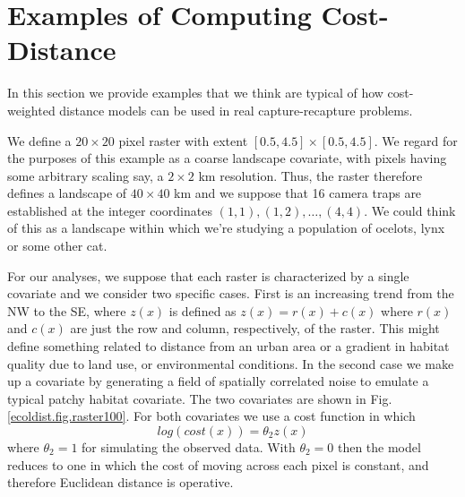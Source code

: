 \documentclass[12pt]{article}
\begin{document}
\section{Examples of Computing Cost-Distance}

In this section we provide examples that we think are typical of
how cost-weighted distance models can be used in real
capture-recapture problems.

We define a $20 \times 20$ pixel raster with
extent $[0.5, 4.5] \times [0.5, 4.5]$.
We regard for the purposes of this example as a coarse landscape
covariate, with pixels having some arbitrary scaling say, a $2 \times 2$ km resolution. Thus, the raster
therefore
defines a landscape of $40 \times 40$ km and we suppose that 16 camera
traps are established at the integer coordinates $(1,1), (1,2), \ldots,
(4,4)$. We could think of this as a landscape within which we're
studying a population of ocelots, lynx or some other cat.

For our analyses, we suppose
that each raster is characterized by a single covariate and we consider two specific
cases. First is an increasing trend from
the NW to the SE, where $z(x)$ is defined as $z(x) = r(x) + c(x)$ where $r(x)$ and $c(x)$ are
just the row and column, respectively, of the raster.
This might define something related to distance
from an urban area or a gradient in habitat quality due to land use,
or environmental conditions.
In the second case we make up a covariate by generating a field of spatially correlated
noise to emulate a typical patchy habitat covariate. The two covariates are shown in
Fig. \ref{ecoldist.fig.raster100}. For both covariates we use a cost
function in which
\[
 log(cost(x))=  \theta_2 z(x)
\]
where $\theta_2 = 1$ for simulating the observed data.
 With $\theta_2=0$ then the
model reduces to one in which the cost of moving across each pixel is
constant, and therefore Euclidean distance is operative.
\end{document}
